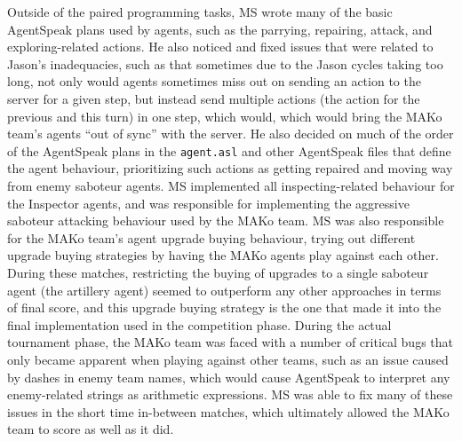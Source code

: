 Outside of the paired programming tasks, MS wrote many of the basic AgentSpeak plans used by agents, such as the parrying, repairing, attack, and exploring-related actions.
He also noticed and fixed issues that were related to Jason's inadequacies, such as  that sometimes due to the Jason cycles taking too long, not only would agents sometimes miss out on sending an action to the server for a given step, but instead send multiple actions (the action for the previous and this turn) in one step, which would, which would bring the MAKo team's agents \enquote{out of sync} with the server.
He also decided on much of the order of the AgentSpeak plans in the \texttt{agent.asl} and other AgentSpeak files that define the agent behaviour, prioritizing such actions as getting repaired and moving way from enemy saboteur agents.
MS implemented all inspecting-related behaviour for the Inspector agents, and was responsible for implementing the aggressive saboteur attacking behaviour used by the MAKo team.
MS was also responsible for the MAKo team's agent upgrade buying behaviour, trying out different upgrade buying strategies by having the MAKo agents play against each other.
During these matches, restricting the buying of upgrades to a single saboteur agent (the artillery agent) seemed to outperform any other approaches in terms of final score, and this upgrade buying strategy is the one that made it into the final implementation used in the competition phase.
During the actual tournament phase, the MAKo team was faced with a number of critical bugs that only became apparent when playing against other teams, such as an issue caused by dashes in enemy team names, which would cause AgentSpeak to interpret any enemy-related strings as arithmetic expressions.
MS was able to fix many of these issues in the short time in-between matches, which ultimately allowed the MAKo team to score as well as it did.
